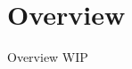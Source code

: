 \documentclass[../../UsabilityReport.tex]{subfiles}
\begin{document}
\section{Overview}
	Overview WIP
\end{document}
